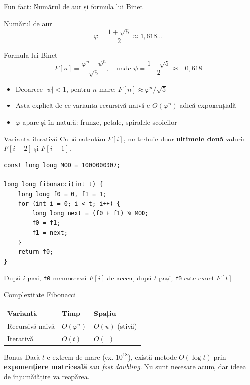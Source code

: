 \documentclass{beamer}
\begin{document}
\begin{frame}{Fun fact: Numărul de aur și formula lui Binet}
  \begin{block}{Numărul de aur}
    \[
      \varphi = \frac{1 + \sqrt{5}}{2} \approx 1{,}618\ldots
    \]
  \end{block}

  \begin{block}{Formula lui Binet}
    \[
      F[n] = \frac{\varphi^n - \psi^n}{\sqrt{5}}, \quad \text{unde } \psi = \frac{1 - \sqrt{5}}{2} \approx -0{,}618
    \]
  \end{block}

  \begin{itemize}
    \item Deoarece $|\psi| < 1$, pentru $n$ mare: $F[n] \approx \varphi^n / \sqrt{5}$
    \item Asta explică de ce varianta recursivă naivă e $O(\varphi^n)$ \textemdash{} adică exponențială
    \item $\varphi$ apare și în natură: frunze, petale, spiralele scoicilor
  \end{itemize}
\end{frame}

\begin{frame}[fragile]{Varianta iterativă}
  Ca să calculăm $F[i]$, ne trebuie doar \textbf{ultimele două} valori: $F[i-2]$ și $F[i-1]$.
  \begin{lstlisting}
const long long MOD = 1000000007;

long long fibonacci(int t) {
    long long f0 = 0, f1 = 1;
    for (int i = 0; i < t; i++) {
        long long next = (f0 + f1) % MOD;
        f0 = f1;
        f1 = next;
    }
    return f0;
}
  \end{lstlisting}
  După $i$ pași, \lstinline|f0| memorează $F[i]$ \textemdash{} de aceea, după $t$ pași, \lstinline|f0| este exact $F[t]$.
\end{frame}

\begin{frame}{Complexitate \textemdash{} Fibonacci}
  \begin{center}
  \begin{tabular}{lll}
    \toprule
    Variantă & Timp & Spațiu \\
    \midrule
    Recursivă naivă & $O(\varphi^n)$ & $O(n)$ (stivă) \\
    Iterativă        & $O(t)$        & $O(1)$ \\
    \bottomrule
  \end{tabular}
  \end{center}

  \smallskip
  \begin{block}{Bonus}
    Dacă $t$ e extrem de mare (ex. $10^{18}$), există metode $O(\log t)$ prin \textbf{exponențiere matriceală} sau \textit{fast doubling}. Nu sunt necesare acum, dar ideea de înjumătățire va reapărea.
  \end{block}
\end{frame}
\end{document}
